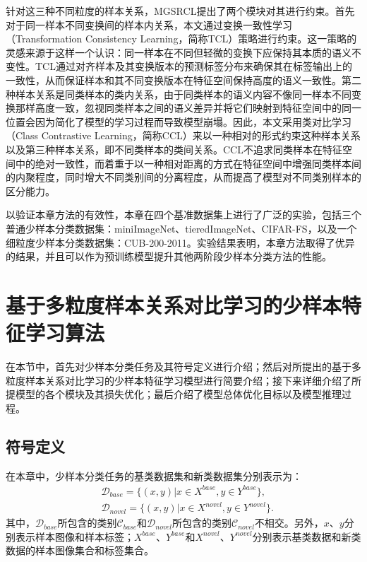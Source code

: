 针对这三种不同粒度的样本关系，MGSRCL提出了两个模块对其进行约束。首先对于同一样本不同变换间的样本内关系，本文通过变换一致性学习（Transformation Consistency Learning，简称TCL）策略进行约束。这一策略的灵感来源于这样一个认识：同一样本在不同但轻微的变换下应保持其本质的语义不变性。TCL通过对齐样本及其变换版本的预测标签分布来确保其在标签输出上的一致性，从而保证样本和其不同变换版本在特征空间保持高度的语义一致性。第二种样本关系是同类样本的类内关系，由于同类样本的语义内容不像同一样本不同变换那样高度一致，忽视同类样本之间的语义差异并将它们映射到特征空间中的同一位置会因为简化了模型的学习过程而导致模型崩塌。因此，本文采用类对比学习（Class Contrastive Learning，简称CCL）来以一种相对的形式约束这种样本关系以及第三种样本关系，即不同类样本的类间关系。CCL不追求同类样本在特征空间中的绝对一致性，而着重于以一种相对距离的方式在特征空间中增强同类样本间的内聚程度，同时增大不同类别间的分离程度，从而提高了模型对不同类别样本的区分能力。

以验证本章方法的有效性，本章在四个基准数据集上进行了广泛的实验，包括三个普通少样本分类数据集：miniImageNet\cite{vinyals2016matching}、tieredImageNet\cite{ren2018meta}、CIFAR-FS\cite{bertinetto2019meta}，以及一个细粒度少样本分类数据集：CUB-200-2011\cite{wah2011caltech}。实验结果表明，本章方法取得了优异的结果，并且可以作为预训练模型提升其他两阶段少样本分类方法的性能。


\section[\hspace{-2pt}基于多粒度样本关系对比学习的少样本特征学习算法]{{\heiti{} \hspace{-8pt}基于多粒度样本关系对比学习的少样本特征学习算法}}\label{section3: 基于多粒度样本关系对比学习的少样本特征学习算法}

在本节中，首先对少样本分类任务及其符号定义进行介绍；然后对所提出的基于多粒度样本关系对比学习的少样本特征学习模型进行简要介绍；接下来详细介绍了所提模型的各个模块及其损失优化；最后介绍了模型总体优化目标以及模型推理过程。

\subsection[\hspace{-2pt}符号定义]{{\heiti{} \hspace{-8pt}符号定义}}\label{section3: 符号定义}

在本章中，少样本分类任务的基类数据集和新类数据集分别表示为：
\begin{equation}
\begin{aligned}
  &\mathcal{D}_{base} = \{(x, y)|x \in X^{base}, y \in Y^{base}\}, \\
  &\mathcal{D}_{novel} = \{(x, y)|x \in X^{novel}, y \in Y^{novel}\}.
\end{aligned}
\end{equation}
其中，$\mathcal{D}_{base}$所包含的类别$\mathcal{C}_{base}$和$\mathcal{D}_{novel}$所包含的类别$\mathcal{C}_{novel}$不相交。另外，$x$、$y$分别表示样本图像和样本标签；$X^{base}$、$Y^{base}$和$X^{novel}$、$Y^{novel}$分别表示基类数据和新类数据的样本图像集合和标签集合。

